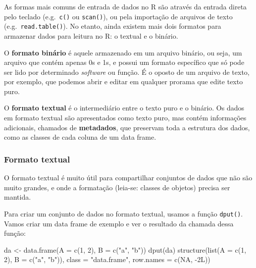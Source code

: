 \documentclass[
  10pt,
  a4paper]{book}
\newenvironment{Shaded}{\begin{snugshade}}{\end{snugshade}}
\newcommand{\AttributeTok}[1]{\textcolor[rgb]{0.77,0.63,0.00}{#1}}
\newcommand{\ConstantTok}[1]{\textcolor[rgb]{0.00,0.00,0.00}{#1}}
\newcommand{\DecValTok}[1]{\textcolor[rgb]{0.00,0.00,0.81}{#1}}
\newcommand{\FunctionTok}[1]{\textcolor[rgb]{0.00,0.00,0.00}{#1}}
\newcommand{\NormalTok}[1]{#1}
\newcommand{\OtherTok}[1]{\textcolor[rgb]{0.56,0.35,0.01}{#1}}
\newcommand{\SpecialCharTok}[1]{\textcolor[rgb]{0.00,0.00,0.00}{#1}}
\newcommand{\StringTok}[1]{\textcolor[rgb]{0.31,0.60,0.02}{#1}}
\begin{document}
As formas mais comuns de entrada de dados no R são através da entrada
direta pelo teclado (e.g.~\texttt{c()} ou \texttt{scan()}), ou pela importação de
arquivos de texto (e.g.~\texttt{read.table()}). No etanto, ainda existem mais
dois formatos para armazenar dados para leitura no R: o textual e o
binário.

O \textbf{formato binário} é aquele armazenado em um arquivo binário, ou
seja, um arquivo que contém apenas 0s e 1s, e possui um formato
específico que só pode ser lido por determinado \emph{software} ou função. É
o oposto de um arquivo de texto, por exemplo, que podemos abrir e editar
em qualquer prorama que edite texto puro.

O \textbf{formato textual} é o intermediário entre o texto puro e o binário.
Os dados em formato textual são apresentados como texto puro, mas contém
informações adicionais, chamados de \textbf{metadados}, que preservam toda a
estrutura dos dados, como as classes de cada coluna de um data frame.

\hypertarget{formato-textual}{%
\subsubsection{Formato textual}\label{formato-textual}}

O formato textual é muito útil para compartilhar conjuntos de dados que
não são muito grandes, e onde a formatação (leia-se: classes de objetos)
precisa ser mantida.

Para criar um conjunto de dados no formato textual, usamos a função
\texttt{dput()}. Vamos criar um data frame de exemplo e ver o resultado da
chamada dessa função:

\begin{Shaded}
\begin{Highlighting}[]
\NormalTok{da }\OtherTok{\textless{}{-}} \FunctionTok{data.frame}\NormalTok{(}\AttributeTok{A =} \FunctionTok{c}\NormalTok{(}\DecValTok{1}\NormalTok{, }\DecValTok{2}\NormalTok{), }\AttributeTok{B =} \FunctionTok{c}\NormalTok{(}\StringTok{"a"}\NormalTok{, }\StringTok{"b"}\NormalTok{))}
\FunctionTok{dput}\NormalTok{(da)}
\FunctionTok{structure}\NormalTok{(}\FunctionTok{list}\NormalTok{(}\AttributeTok{A =} \FunctionTok{c}\NormalTok{(}\DecValTok{1}\NormalTok{, }\DecValTok{2}\NormalTok{), }\AttributeTok{B =} \FunctionTok{c}\NormalTok{(}\StringTok{"a"}\NormalTok{, }\StringTok{"b"}\NormalTok{)), }\AttributeTok{class =} \StringTok{"data.frame"}\NormalTok{, }\AttributeTok{row.names =} \FunctionTok{c}\NormalTok{(}\ConstantTok{NA}\NormalTok{, }
\SpecialCharTok{{-}}\NormalTok{2L))}
\end{Highlighting}
\end{Shaded}
\end{document}
